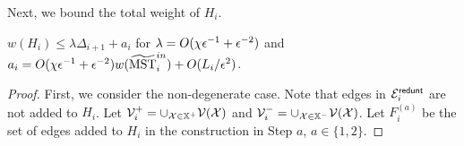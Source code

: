 Next, we bound the total weight of $H_i$.  



\begin{lemma}\label{lm:Hi-WeightTE}  $w(H_i) \leq \lambda \Delta_{i+1} + a_i$ for $\lambda = O(\chi \epsilon^{-1}  + \epsilon^{-2})$  and $a_i =   O(\chi \epsilon^{-1} +\epsilon^{-2})w(\widetilde{\mathrm{MST}}^{in}_i) + O(L_i/\epsilon^2)$.  
\end{lemma}
\begin{proof}  First, we consider the non-degenerate case. Note that edges in $\mathcal{E}^{\mathsf{redunt}}_i$ are not added to $H_i$. Let $\mathcal{V}_i^{+} = \cup_{\mathcal{X} \in \mathbb{X}^{+}}\mathcal{V}(\mathcal{X})$ and  $\mathcal{V}_i^{-} = \cup_{\mathcal{X} \in \mathbb{X}^{-}}\mathcal{V}(\mathcal{X})$. %
	Let $F^{(a)}_i$ be the set of edges added to $H_i$ in the construction in Step $a$, $a\in \{1,2\}$. 
	

\end{proof}
